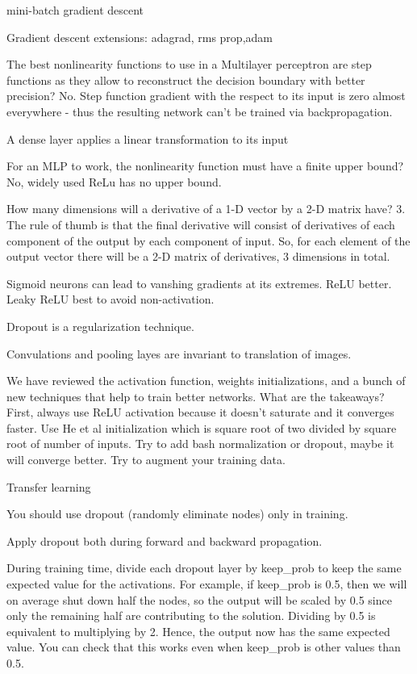\documentclass[]{book}
\begin{document}
mini-batch gradient descent

Gradient descent extensions: adagrad, rms prop,adam

The best nonlinearity functions to use in a Multilayer perceptron are
step functions as they allow to reconstruct the decision boundary with
better precision? No. Step function gradient with the respect to its
input is zero almost everywhere - thus the resulting network can't be
trained via backpropagation.

A dense layer applies a linear transformation to its input

For an MLP to work, the nonlinearity function must have a finite upper
bound? No, widely used ReLu has no upper bound.

How many dimensions will a derivative of a 1-D vector by a 2-D matrix
have? 3. The rule of thumb is that the final derivative will consist of
derivatives of each component of the output by each component of input.
So, for each element of the output vector there will be a 2-D matrix of
derivatives, 3 dimensions in total.

Sigmoid neurons can lead to vanshing gradients at its extremes. ReLU
better. Leaky ReLU best to avoid non-activation.

Dropout is a regularization technique.

Convulations and pooling layes are invariant to translation of images.

We have reviewed the activation function, weights initializations, and a
bunch of new techniques that help to train better networks. What are the
takeaways? First, always use ReLU activation because it doesn't saturate
and it converges faster. Use He et al initialization which is square
root of two divided by square root of number of inputs. Try to add bash
normalization or dropout, maybe it will converge better. Try to augment
your training data.

Transfer learning

You should use dropout (randomly eliminate nodes) only in training.

Apply dropout both during forward and backward propagation.

During training time, divide each dropout layer by keep\_prob to keep
the same expected value for the activations. For example, if keep\_prob
is 0.5, then we will on average shut down half the nodes, so the output
will be scaled by 0.5 since only the remaining half are contributing to
the solution. Dividing by 0.5 is equivalent to multiplying by 2. Hence,
the output now has the same expected value. You can check that this
works even when keep\_prob is other values than 0.5.
\end{document}
